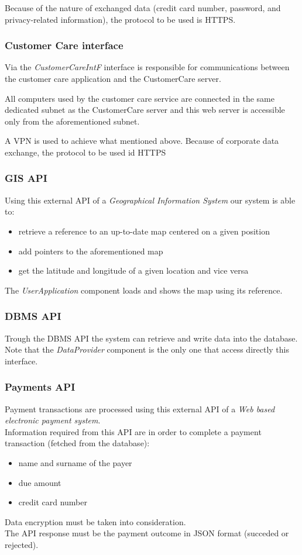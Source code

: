 Because of the nature of exchanged data (credit card number, password, and privacy-related information), the protocol to be used is HTTPS.

\subsubsection{Customer Care interface}
Via the \emph{CustomerCareIntF} interface is responsible for communications between the customer care application and the CustomerCare server.

All computers used by the customer care service are connected in the same dedicated subnet as the CustomerCare server and this web server is accessible only from the aforementioned subnet. 

A VPN is used to achieve what mentioned above. Because of corporate data exchange, the protocol to be used id HTTPS

\subsubsection{GIS API}
\label{sec:gis}
Using this external API of a \emph{Geographical Information System} our system is able to:
\begin{itemize}
	\item retrieve a reference to an up-to-date map centered on a given position
	\item add pointers to the aforementioned map
	\item get the latitude and longitude of a given location and vice versa
\end{itemize}
The \emph{UserApplication} component loads and shows the map using its reference.

\subsubsection{DBMS API}
Trough the DBMS API the system can retrieve and write data into the database. Note that the \mbox{\emph{DataProvider}} component is the only one that access directly this interface.

\subsubsection{Payments API}
Payment transactions are processed using this external API of a \emph{Web based electronic payment system}.\\
Information required from this API are in order to complete a payment transaction (fetched from the database):
\begin{itemize}
	\item name and surname of the payer
	\item due amount
	\item credit card number
\end{itemize}
Data encryption must be taken into consideration.\\
The API response must be the payment outcome in JSON format (succeded or rejected).
